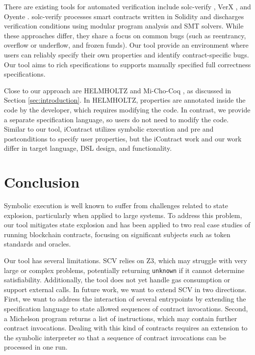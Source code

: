 \documentclass[runningheads]{llncs}
\begin{document}
There are existing tools for automated verification include solc-verify \cite{solc}, VerX \cite{verx}, and Oyente \cite{oyente}. solc-verify processes smart contracts written in Solidity and discharges verification conditions using modular program analysis and SMT solvers.
While these approaches differ, they share a focus on common bugs (such as reentrancy, overflow or underflow, and frozen funds). Our tool provide an environment where users can reliably specify their own properties and identify contract-specific bugs. Our tool aims to rich specifications to supports manually specified full correctness specifications.

Close to our approach are HELMHOLTZ \cite{helmholtz} and Mi-Cho-Coq \cite{micho}, as discussed in Section \ref{sec:introduction}. In HELMHOLTZ, properties are annotated inside the code by the developer, which requires modifying the code. In contrast, we provide a separate specification language, so users do not need to modify the code. Similar to our tool, iContract \cite{icontract} utilizes symbolic execution and pre and postconditions to specify user properties, but the iContract work and our work differ in target language, DSL design, and functionality.
\section{Conclusion}
\label{sec:concl-sect-append}
Symbolic execution is well known to suffer from challenges related to state explosion, particularly when applied to large systems. To address this problem, our tool mitigates state explosion and has been applied to two real case studies of running blockchain contracts, focusing on significant subjects such as token standards and oracles.

Our tool has several limitations. SCV relies on Z3, which may struggle with very large or complex problems, potentially returning \texttt{unknown} if it cannot determine satisfiability. Additionally, the tool does not yet handle gas consumption or support external calls.
In future work, we want to extend SCV in two directions. 
First, we want to address the interaction of several entrypoints by
extending the specification language to state allowed sequences of
contract invocations.  Second, a Michelson program returns a list of instructions, which may contain
further contract invocations. Dealing with this kind of contracts
requires an extension to the symbolic interpreter so that a sequence
of contract invocations can be processed in one run.
\newpage


%
\end{document}
